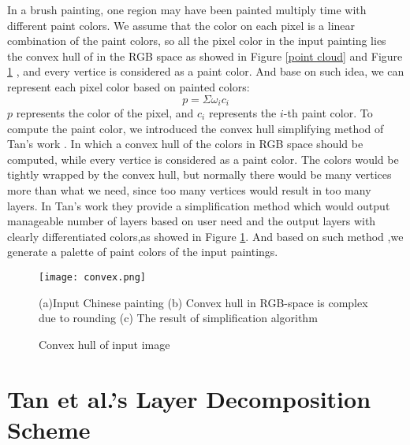 In a brush painting, one region may have been painted multiply time with different paint colors. We assume that the color on each pixel is a linear combination of the paint colors, so all the pixel color in the input painting lies the convex hull of in the RGB space as showed in Figure \ref{point cloud} and Figure \ref{convex} , and every vertice is considered as a paint color. And base on such idea, we can represent each pixel color based on painted colors: 
\begin{equation*}
p=\Sigma \omega_i c_i
\end{equation*}
$p$ represents the color of the pixel, and $c_i$ represents the $i$-th paint color. 
To compute the paint color, we introduced the convex hull simplifying method of Tan's work \cite{tan2016decomposing}. In which a convex hull of the colors in RGB space should be computed, while every vertice is considered as a paint color. The colors would be tightly wrapped by the convex hull, but normally there would be many vertices more than what we need, since too many vertices would result in too many layers. In Tan's work \cite{tan2016decomposing} they provide a simplification method which would output manageable number of layers based on user need and the output layers with clearly differentiated colors,as showed in Figure \ref{convex}. And based on such method ,we generate a palette of paint colors of the input paintings. 

\begin{figure}[H]
	\centering
	\texttt{[image: convex.png]}
	\caption{Convex hull of input image}
	\label{convex}
	\medskip
	\small
	(a)Input Chinese painting (b) Convex hull in RGB-space is complex due to rounding (c) The result of simplification algorithm 
\end{figure}

\section{Tan et al.'s Layer Decomposition Scheme}

